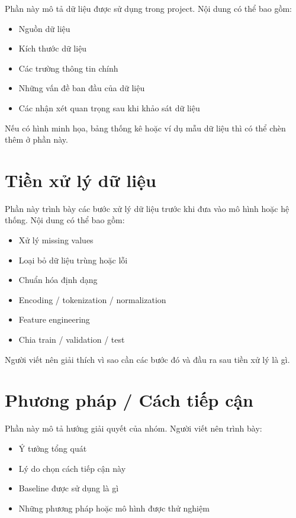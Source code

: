 \documentclass[12pt]{ai_conquer2026}
\begin{document}
Phần này mô tả dữ liệu được sử dụng trong project. Nội dung có thể bao gồm:
\begin{itemize}
    \item Nguồn dữ liệu
    \item Kích thước dữ liệu
    \item Các trường thông tin chính
    \item Những vấn đề ban đầu của dữ liệu
    \item Các nhận xét quan trọng sau khi khảo sát dữ liệu
\end{itemize}

Nếu có hình minh họa, bảng thống kê hoặc ví dụ mẫu dữ liệu thì có thể chèn thêm ở phần này.

\section{Tiền xử lý dữ liệu}

Phần này trình bày các bước xử lý dữ liệu trước khi đưa vào mô hình hoặc hệ thống. Nội dung có thể bao gồm:
\begin{itemize}
    \item Xử lý missing values
    \item Loại bỏ dữ liệu trùng hoặc lỗi
    \item Chuẩn hóa định dạng
    \item Encoding / tokenization / normalization
    \item Feature engineering
    \item Chia train / validation / test
\end{itemize}

Người viết nên giải thích vì sao cần các bước đó và đầu ra sau tiền xử lý là gì.

\section{Phương pháp / Cách tiếp cận}

Phần này mô tả hướng giải quyết của nhóm. Người viết nên trình bày:
\begin{itemize}
    \item Ý tưởng tổng quát
    \item Lý do chọn cách tiếp cận này
    \item Baseline được sử dụng là gì
    \item Những phương pháp hoặc mô hình được thử nghiệm
\end{itemize}
\end{document}
